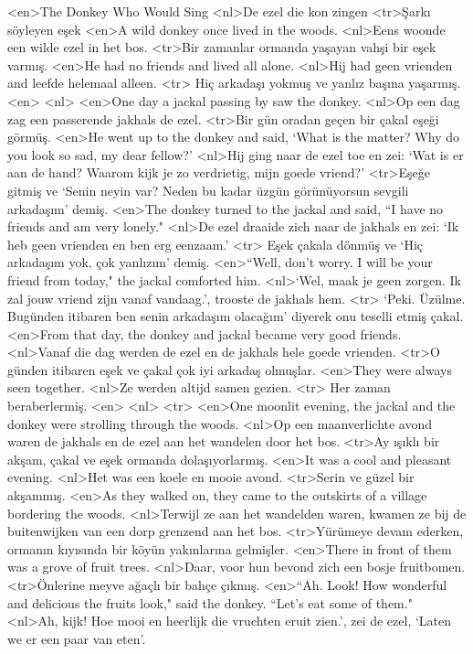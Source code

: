 <en>The Donkey Who Would Sing 
<nl>De ezel die kon zingen
<tr>Şarkı söyleyen eşek 
<en>A wild donkey once lived in the woods. 
<nl>Eens woonde een wilde ezel in het bos.
<tr>Bir zamanlar ormanda yaşayan vahşi bir eşek varmış.
<en>He had no friends and lived all alone. 
<nl>Hij had geen vrienden and leefde helemaal alleen.
<tr> Hiç arkadaşı yokmuş ve yanlız başına yaşarmış.
<en>
<nl>
<en>One day a jackal passing by saw the donkey. 
<nl>Op een dag zag een passerende jakhals de ezel.
<tr>Bir gün oradan geçen bir çakal eşeği görmüş.
<en>He went up to the donkey and said, `What is the matter? Why do you look so sad, my dear fellow?' 
<nl>Hij ging naar de ezel toe en zei: `Wat is er aan de hand? Waarom kijk je zo verdrietig, mijn goede vriend?'
<tr>Eşeğe gitmiş ve `Senin neyin var? Neden bu kadar üzgün görünüyorsun sevgili arkadaşım' demiş.
<en>The donkey turned to the jackal and said, “I have no friends and am very lonely." 
<nl>De ezel draaide zich naar de jakhals en zei: `Ik heb geen vrienden en ben erg eenzaam.'
<tr> Eşek çakala dönmüş ve `Hiç arkadaşım yok, çok yanlızım' demiş.
<en>“Well, don't worry. I will be your friend from today," the jackal comforted him. 
<nl>`Wel, maak je geen zorgen. Ik zal jouw vriend zijn vanaf vandaag.', trooste de jakhals hem.
<tr> `Peki. Üzülme. Bugünden itibaren ben senin arkadaşım olacağım' diyerek onu teselli etmiş çakal.
<en>From that day, the donkey and jackal became very good friends. 
<nl>Vanaf die dag werden de ezel en de jakhals hele goede vrienden.
<tr>O günden itibaren eşek ve çakal çok iyi arkadaş olmuşlar.
<en>They were always seen together. 
<nl>Ze werden altijd samen gezien.
<tr> Her zaman beraberlermiş.
<en>
<nl>
<tr>
<en>One moonlit evening, the jackal and the donkey were strolling through the woods. 
<nl>Op een maanverlichte avond waren de jakhals en de ezel aan het wandelen door het bos.
<tr>Ay ışıklı bir akşam, çakal ve eşek ormanda dolaşıyorlarmış.
<en>It was a cool and pleasant evening. 
<nl>Het was een koele en mooie avond.
<tr>Serin ve güzel bir akşammış.
<en>As they walked on, they came to the outskirts of a village bordering the woods. 
<nl>Terwijl ze aan het wandelden waren, kwamen ze bij de buitenwijken van een dorp grenzend aan het bos.
<tr>Yürümeye devam ederken, ormanın kıyısında bir köyün yakınlarına gelmişler.
<en>There in front of them was a grove of fruit trees. 
<nl>Daar, voor hun bevond zich een bosje fruitbomen.
<tr>Önlerine meyve ağaçlı bir bahçe çıkmış.
<en>“Ah. Look! How wonderful and delicious the fruits look," said the donkey. “Let’s eat some of them." 
<nl>Ah, kijk! Hoe mooi en heerlijk die vruchten eruit zien.', zei de ezel, `Laten we er een paar van eten'.
